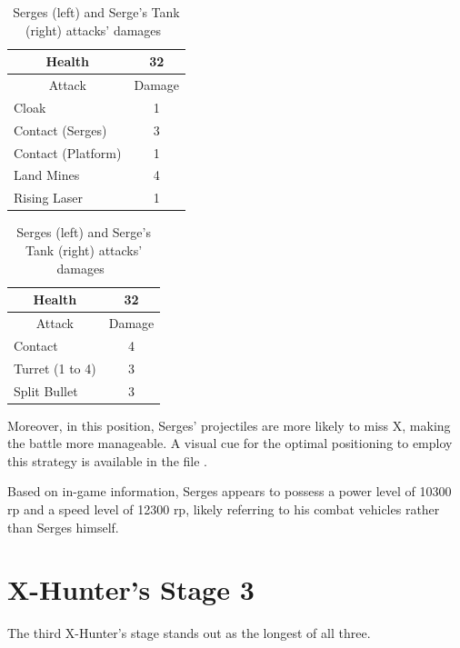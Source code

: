 \begin{table}[htp]
	\centering
	\begin{minipage}{.45\linewidth}
		\centering
		\begin{tabular}[h]{l c }
			\toprule
			\multicolumn{1}{c}{Health}  & 32 \\
			\midrule
			\multicolumn{1}{c}{Attack} & \multicolumn{1}{c}{Damage}\\
			Cloak & 1 \\
			Contact (Serges)& 3\\
			Contact (Platform)& 1\\
			Land Mines & 4\\
			Rising Laser& 1\\
			\bottomrule
		\end{tabular}
	\end{minipage}
	\begin{minipage}{.45\linewidth}
		\centering
		\begin{tabular}[h]{l c }
			\toprule
			\multicolumn{1}{c}{Health}  & 32 \\
			\midrule
			\multicolumn{1}{c}{Attack} & \multicolumn{1}{c}{Damage}\\
			Contact & 4 \\
			Turret (1 to 4) & 3\\
			Split Bullet & 3\\
			\bottomrule
		\end{tabular}
	\end{minipage}
	\caption{Serges (left) and Serge's Tank (right) attacks' damages~\cite{wiki:Serges,book:Compendium}}
\end{table}
Moreover, in this position, Serges' projectiles are more likely to miss X, making the battle more manageable. A visual cue for the optimal positioning to employ this strategy is available in the file .

Based on in-game information, Serges appears to possess a power level of 10300 rp and a speed level of 12300 rp, likely referring to his combat vehicles rather than Serges himself.



\section{X-Hunter's Stage 3}
The third X-Hunter's stage stands out as the longest of all three.

